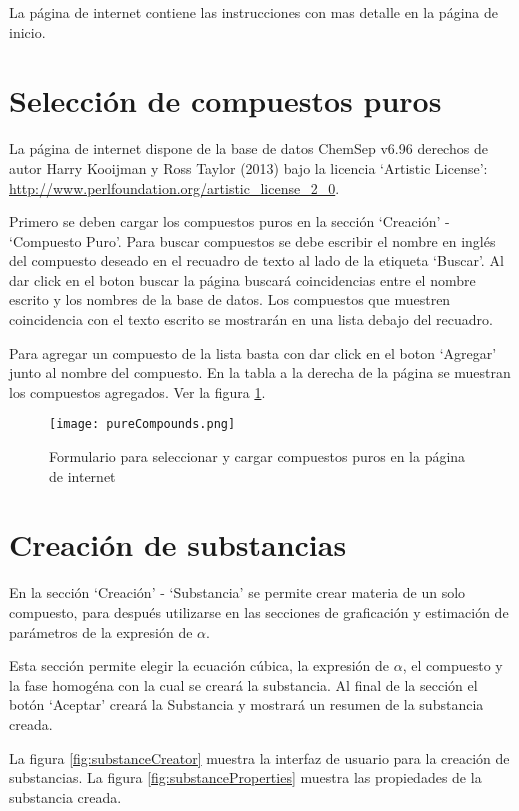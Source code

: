 	La página de internet contiene las instrucciones con mas detalle en la página de inicio.

\section{Selección de compuestos puros}\label{sec:webCompounds}

	La página de internet dispone de la base de datos ChemSep v6.96 derechos de autor  Harry Kooijman y Ross Taylor (2013) bajo la licencia `Artistic License': \url{ http://www.perlfoundation.org/artistic_license_2_0}.

	Primero se deben cargar los compuestos puros en la sección `Creación' - `Compuesto Puro'. Para buscar compuestos se debe escribir el nombre en inglés del compuesto deseado en el recuadro de texto al lado de la etiqueta `Buscar'. Al dar click en el boton buscar la página buscará coincidencias entre el nombre escrito y los nombres de la base de datos. Los compuestos que muestren coincidencia con el texto escrito se mostrarán en una lista debajo del recuadro.

	Para agregar un compuesto de la lista basta con dar click en el boton `Agregar' junto al nombre del compuesto. En la tabla a la derecha de la página se muestran los compuestos agregados. Ver la figura \ref{fig:pureCompounds}.

	\begin{figure}[H]
		\centering
		\texttt{[image: pureCompounds.png]}
		\caption{Formulario para seleccionar y cargar compuestos puros en la página de internet}
		\label{fig:pureCompounds}
	\end{figure}

\section{Creación de substancias}\label{sec:webSubstanceCreator}
	
	En la sección `Creación' - `Substancia' se permite crear materia de un solo compuesto, para después utilizarse en las secciones de graficación y estimación de parámetros de la expresión de $\alpha$.

	Esta sección permite elegir la ecuación cúbica, la expresión de $\alpha$, el compuesto y la fase homogéna con la cual se creará la substancia. Al final de la sección el botón `Aceptar' creará la Substancia y mostrará un resumen de la substancia creada.

	La figura \ref{fig:substanceCreator} muestra la interfaz de usuario para la creación de substancias. La figura \ref{fig:substanceProperties} muestra las propiedades de la substancia creada.

